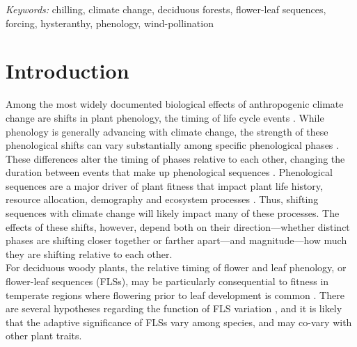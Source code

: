 \documentclass[12pt]{article}\usepackage[]{graphicx}\usepackage[]{color}
\begin{document}

\noindent \emph{Keywords:} chilling, climate change, deciduous forests, flower-leaf sequences, forcing, hysteranthy, phenology, wind-pollination  \\ 

\section*{Introduction}
\noindent Among the most widely documented biological effects of anthropogenic climate change are shifts in plant phenology, the timing of life cycle events \citep{Parmesan2003,Menzel2006,Cleland2007}. While phenology is generally advancing with climate change, the strength of these phenological shifts can vary substantially among specific phenological phases \citep{Augspurger:2020aa}. These differences alter the timing of phases relative to each other, changing the duration between events that make up phenological sequences \citep{Ettinger2018}. Phenological sequences are a major driver of plant fitness that impact plant life history, resource allocation, demography and ecosystem processes \citep{Post:2008aa}. Thus, shifting sequences with climate change will likely impact many of these processes. The effects of these shifts, however, depend both on their direction---whether distinct phases are shifting closer together or farther apart---and magnitude---how much they are shifting relative to each other.\\ 

\noindent \noindent For deciduous woody plants, the relative timing of flower and leaf phenology, or flower-leaf sequences (FLSs), may be particularly consequential to fitness in temperate regions where flowering prior to leaf development is common \citep{Rathcke_1985}. There are several hypotheses regarding the function of FLS variation \citep[see][]{Gougherty2018}, and it is likely that the adaptive significance of FLSs vary among species, and may co-vary with other plant traits.\\
\end{document}
